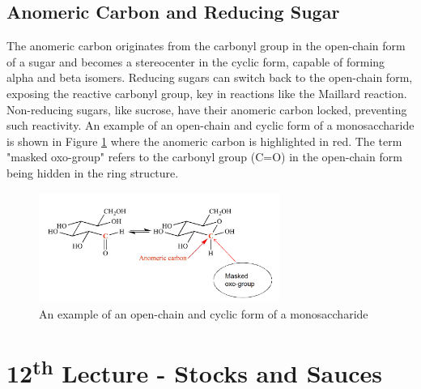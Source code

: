 \subsection*{Anomeric Carbon and Reducing Sugar}
The anomeric carbon originates from the carbonyl group in the open-chain form of a sugar and becomes a stereocenter in the cyclic form, capable of forming alpha and beta isomers. Reducing sugars can switch back to the open-chain form, exposing the reactive carbonyl group, key in reactions like the Maillard reaction. Non-reducing sugars, like sucrose, have their anomeric carbon locked, preventing such reactivity. An example of an open-chain and cyclic form of a monosaccharide is shown in Figure \ref{fig:L02_anomeric_carbon} where the anomeric carbon is highlighted in red. The term "masked oxo-group" refers to the carbonyl group (C=O) in the open-chain form being hidden in the ring structure.
\begin{figure}[h]
    \centering
    \includegraphics[width=0.7\textwidth]{figures/L02_anomeric_carbon.png}
    \caption{An example of an open-chain and cyclic form of a monosaccharide}
    \label{fig:L02_anomeric_carbon}
\end{figure}


\section{12\texorpdfstring{\textsuperscript{th}}{th} Lecture - Stocks and Sauces}


